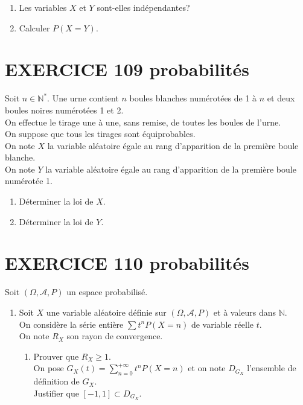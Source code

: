 \documentclass[10pt,oneside]{article}
\begin{document}
\begin{flushleft}
\begin{enumerate}
\item
Les variables $X$ et $Y$ sont-elles indépendantes?
\item
Calculer $P(X=Y)$.
\end{enumerate}

\section*{EXERCICE 109 \:probabilités}

Soit $n\in\mathbb{N}^*$.
Une urne contient $n$ boules blanches numérotées de 1 à $n$ et deux boules noires numérotées 1 et 2.\\
On effectue le tirage une à une, sans remise, de toutes les boules de l'urne.\\
On suppose que tous les tirages sont équiprobables.\\
On note $X$ la variable aléatoire égale au rang d'apparition de la première boule blanche.\\
On note $Y$ la variable aléatoire égale au rang d'apparition de la première boule numérotée 1.\\
\begin{enumerate}
\item 
Déterminer la loi de $X$.
\item
Déterminer la loi de $Y$.



\end{enumerate}  

\section*{EXERCICE 110 \:probabilités}

Soit $(\Omega,\mathcal{A},P)$ un espace probabilisé.\\

\begin{enumerate}
\item 
Soit $X$ une variable aléatoire définie sur  $(\Omega,\mathcal{A},P)$ et à valeurs dans $\mathbb{N}$.\\
On considère la série entière  $\displaystyle\sum t^nP(X=n)$ de variable réelle $t$.\\
On note $R_X$ son rayon de convergence.\\
\begin{enumerate}
\item 
Prouver que $R_X\geqslant 1$.\:\:\:\:\\
On pose  $G_X(t)=\displaystyle\sum\limits_ {n=0}^{+\infty}t^nP(X=n)$ et on  note $D_{G_X}$ l'ensemble de définition de $G_X$.\\
Justifier que   $\left[-1,1 \right] \subset D_{G_X}$.\:\:\:\:\\
 

\end{enumerate}
\end{enumerate}
\end{flushleft}
\end{document}
